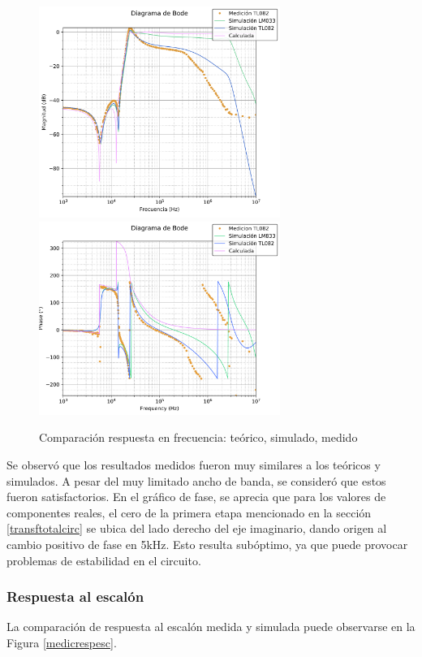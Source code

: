 \begin{figure}[H]
    \centering
    \includegraphics[width=0.7\textwidth]{../Ex3/Resources/medicrespfrec.png}
    \includegraphics[width=0.7\textwidth]{../Ex3/Resources/medicrespfrecfase.png}
    \caption{Comparación respuesta en frecuencia: teórico, simulado, medido}
    \label{medicrespfrec}
\end{figure}

Se observó que los resultados medidos fueron muy similares a los teóricos y simulados. A pesar del muy limitado ancho de banda, se consideró que estos fueron satisfactorios. En el gráfico de fase, se aprecia que para los valores de componentes reales, el cero de la primera etapa mencionado en la sección \ref{transftotalcirc} se ubica del lado derecho del eje imaginario, dando origen al cambio positivo de fase en 5kHz. Esto resulta subóptimo, ya que puede provocar problemas de estabilidad en el circuito.

\subsubsection{Respuesta al escalón}
La comparación de respuesta al escalón medida y simulada puede observarse en la Figura \ref{medicrespesc}.

